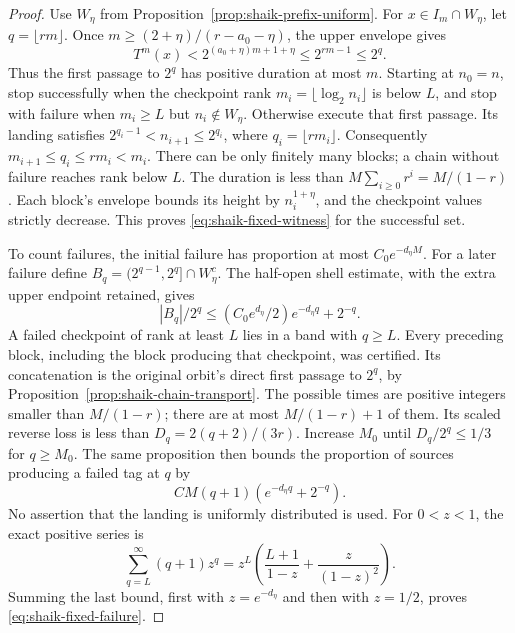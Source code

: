 \documentclass[11pt]{article}
\theoremstyle{remark}\newtheorem{remark}[proposition]{Remark}
\begin{document}
\begin{proof}
Use \(W_\eta\) from Proposition~\ref{prop:shaik-prefix-uniform}.
For \(x\in I_m\cap W_\eta\), let \(q=\lfloor rm\rfloor\).
Once \(m\ge(2+\eta)/(r-a_0-\eta)\), the upper envelope gives
\[
 T^m(x)<2^{(a_0+\eta)m+1+\eta}\le2^{rm-1}\le2^q.
\]
Thus the first passage to \(2^q\) has positive duration at most \(m\).
Starting at \(n_0=n\), stop successfully when the checkpoint rank
\(m_i=\lfloor\log_2n_i\rfloor\) is below \(L\), and stop with failure
when \(m_i\ge L\) but \(n_i\notin W_\eta\). Otherwise execute that
first passage. Its landing satisfies
\(2^{q_i-1}<n_{i+1}\le2^{q_i}\), where \(q_i=\lfloor rm_i\rfloor\).
Consequently \(m_{i+1}\le q_i\le rm_i<m_i\).
There can be only finitely many blocks; a chain without failure reaches
rank below \(L\). The duration is less than
\(M\sum_{i\ge0}r^i=M/(1-r)\).
Each block's envelope bounds its height by \(n_i^{1+\eta}\),
and the checkpoint values strictly decrease. This proves
\eqref{eq:shaik-fixed-witness} for the successful set.

To count failures, the initial failure has proportion
at most \(C_0e^{-d_\eta M}\).
For a later failure define
\(B_q=(2^{q-1},2^q]\cap W_\eta^c\).
The half-open shell estimate, with the extra upper endpoint retained, gives
\[
 |B_q|/2^q\le (C_0e^{d_\eta}/2)e^{-d_\eta q}+2^{-q}.
\]
A failed checkpoint of rank at least \(L\) lies in a band with \(q\ge L\).
Every preceding block, including the block producing that checkpoint,
was certified. Its concatenation is the original orbit's direct first
passage to \(2^q\), by Proposition~\ref{prop:shaik-chain-transport}.
The possible times are positive integers smaller than \(M/(1-r)\);
there are at most \(M/(1-r)+1\) of them. Its scaled reverse loss is
less than \(D_q=2(q+2)/(3r)\).
Increase \(M_0\) until \(D_q/2^q\le1/3\) for \(q\ge M_0\).
The same proposition then bounds the proportion of sources producing
a failed tag at \(q\) by
\[
 C M(q+1)(e^{-d_\eta q}+2^{-q}).
\]
No assertion that the landing is uniformly distributed is used.
For \(0<z<1\), the exact positive series is
\[
 \sum_{q=L}^{\infty}(q+1)z^q
 =z^L\left(\frac{L+1}{1-z}+\frac{z}{(1-z)^2}\right).
\]
Summing the last bound, first with \(z=e^{-d_\eta}\) and then with
\(z=1/2\), proves \eqref{eq:shaik-fixed-failure}.


\end{proof}
\end{document}
